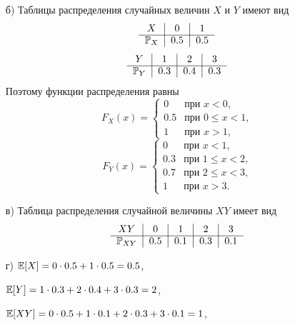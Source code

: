 \begin{enumerate}
\begin{enumerate}
\item[б)] Таблицы распределения случайных величин $X$ и $Y$ имеют вид
\[
\begin{tabular}{c|c|c}
  $X$             & $0$     & $1$    \\ \cline{1-3}
  $\P_X$  & $0.5$   & $0.5$  \\
\end{tabular}
\]
\[
\begin{tabular}{c|c|c|c}
  $Y$             & $1$     & $2$     & $3$   \\ \cline{1-4}
  $\P_Y$  & $0.3$   & $0.4$   & $0.3$ \\
\end{tabular}
\]
Поэтому функции распределения равны
\[
F_X(x) =
                 \begin{cases}
                     0                   &   \text{при $x < 0$,} \\
                     0.5                 &   \text{при $0 \leq x < 1$,} \\
                     1                   &   \text{при $x > 1$,}
                  \end{cases}
\]
\[
F_Y(x) =
                 \begin{cases}
                     0                   &   \text{при $x < 1$,} \\
                     0.3                 &   \text{при $1 \leq x < 2$,} \\
                     0.7                 &   \text{при $2 \leq x < 3$,} \\
                     1                   &   \text{при $x > 3$.}
                  \end{cases}
\]

\item[в)] Таблица распределения случайной величины $XY$ имеет вид
\[
\begin{tabular}{c|c|c|c|c}
  $XY$               & $0$     & $1$     & $2$     & $3$ \\ \cline{1-5}
  $\P_{XY}$  & $0.5$   & $0.1$   & $0.3$   & $0.1$ \\
\end{tabular}
\]

\item[г)] $\mathbb{E}[X] = 0 \cdot 0.5 + 1 \cdot 0.5 = 0.5$,

$\mathbb{E}[Y] = 1 \cdot 0.3 + 2 \cdot 0.4 + 3 \cdot 0.3 = 2$,

$\mathbb{E}[XY] = 0 \cdot 0.5 + 1 \cdot 0.1 + 2 \cdot 0.3 + 3 \cdot 0.1 = 1$,


\end{enumerate}
\end{enumerate}
